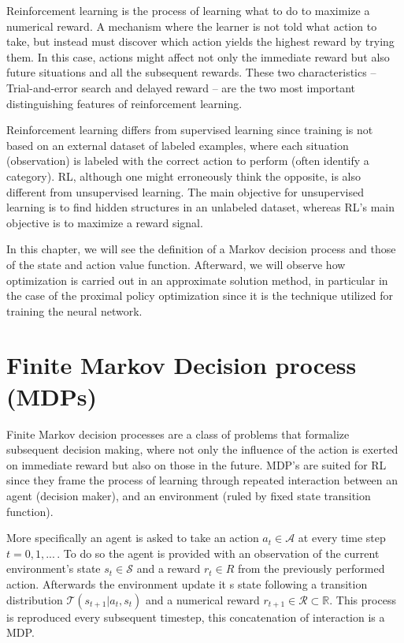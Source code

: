 Reinforcement learning is the process of learning what to do to maximize a numerical reward. A mechanism where the learner is not told what action to take, but instead must discover which action yields the highest reward by trying them. In this case, actions might affect not only the immediate reward but also future situations and all the subsequent rewards. These two characteristics -- Trial-and-error search and delayed reward -- are the two most important distinguishing features of reinforcement learning.

Reinforcement learning differs from supervised learning since training is not based on an external dataset of labeled examples, where each situation (observation) is labeled with the correct action to perform (often identify a category). RL, although one might erroneously think the opposite, is also different from unsupervised learning. The main objective for unsupervised learning is to find hidden structures in an unlabeled dataset, whereas RL's main objective is to maximize a reward signal. 

In this chapter, we will see the definition of a Markov decision process and those of the state and action value function. Afterward, we will observe how optimization is carried out in an approximate solution method, in particular in the case of the proximal policy optimization since it is the technique utilized for training the neural network.

\section{Finite Markov Decision process (MDPs)}

Finite Markov decision processes are a class of problems that formalize subsequent decision making, where not only the influence of the action is exerted on immediate reward but also on those in the future. MDP's are suited for RL since they frame the process of learning through repeated interaction between an agent (decision maker), and an environment (ruled by fixed state transition function).

More specifically an agent is asked to take an action \( a_t \in \mathcal{A} \) at every time step \( t = 0,1,...\, \). To do so the agent is provided with an observation of the current environment's state \( s_t \in \mathcal{S} \) and a reward \( r_t \in R \) from the previously performed action. Afterwards the environment update it
s state following a transition distribution \( \mathcal{T}(s_{t+1}|a_t,s_t) \) and a numerical reward \( r_{t+1} \in \mathcal{R} \subset \mathbb{R} \). This process is reproduced every subsequent timestep, this concatenation of interaction is a MDP.

